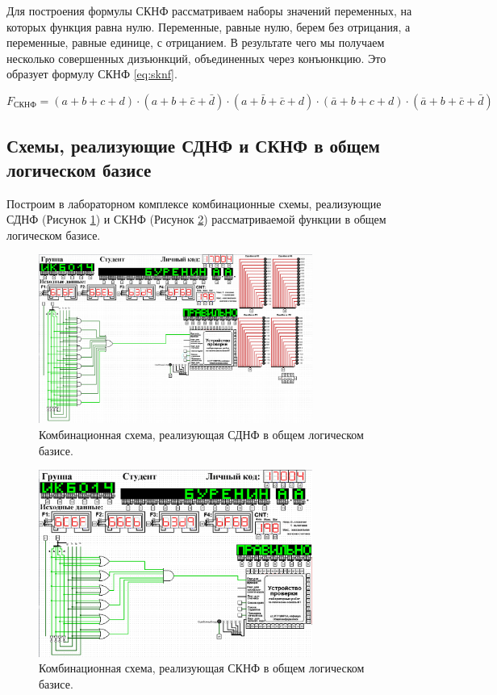 \documentclass[a4paper]{article}
\begin{document}
	Для построения формулы СКНФ рассматриваем наборы значений переменных, на которых функция равна нулю. Переменные, равные нулю, берем без отрицания, а переменные, равные единице, с отрицанием. В результате чего мы получаем несколько совершенных дизъюнкций, объединенных через конъюнкцию. Это образует формулу СКНФ \eqref{eq:sknf}.
	
	
	\begin{equation} \label{eq:sknf}
		F_{СКНФ}=(a + b + c + d)\cdot(a + b + \bar c + \bar d)\cdot(a + \bar b + \bar c + d)\cdot(\bar a + b + c + d)\cdot(\bar a + b + \bar c + \bar d)
	\end{equation}
	\subsection{Схемы, реализующие СДНФ и СКНФ в общем логическом базисе}
	Построим в лабораторном комплексе комбинационные схемы, реализующие СДНФ (Рисунок \ref{img:sdnf}) и СКНФ (Рисунок \ref{img:sknf}) рассматриваемой функции в общем логическом базисе.
	
	\begin{figure}[h]
		\centering
		\includegraphics[width=0.8\textwidth]{sdnf.png}
		
		\caption{\centering Комбинационная схема, реализующая СДНФ в общем логическом базисе.}
		\label{img:sdnf}
	\end{figure}

	\begin{figure}[h]
		\centering
		\includegraphics[width=0.8\textwidth]{sknf.png}
	
		\caption{\centering Комбинационная схема, реализующая СКНФ в общем логическом базисе.}
		\label{img:sknf}
	\end{figure}
\end{document}
